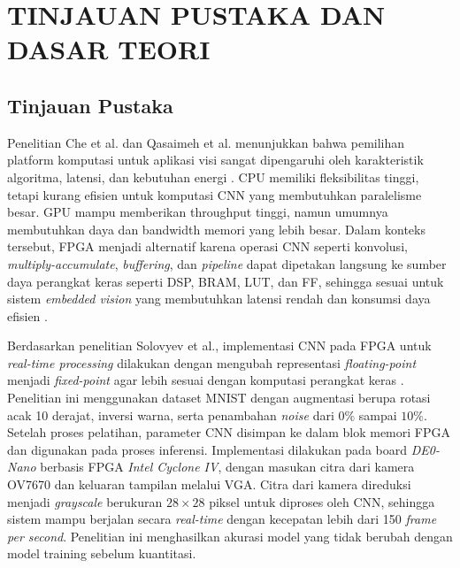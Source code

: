 \chapter{TINJAUAN PUSTAKA DAN DASAR TEORI}

\section{Tinjauan Pustaka}

    Penelitian Che et al. dan Qasaimeh et al. menunjukkan bahwa pemilihan
    platform komputasi untuk aplikasi visi sangat dipengaruhi oleh
    karakteristik algoritma, latensi, dan kebutuhan energi
    \cite{Che2009AcceleratingAA,Qasaimeh2019ComparingEE}. CPU memiliki
    fleksibilitas tinggi, tetapi kurang efisien untuk komputasi CNN yang
    membutuhkan paralelisme besar. GPU mampu memberikan throughput tinggi,
    namun umumnya membutuhkan daya dan bandwidth memori yang lebih besar.
    Dalam konteks tersebut, FPGA menjadi alternatif karena operasi CNN
    seperti konvolusi, \emph{multiply-accumulate}, \emph{buffering}, dan
    \emph{pipeline} dapat dipetakan langsung ke sumber daya perangkat keras
    seperti DSP, BRAM, LUT, dan FF, sehingga sesuai untuk sistem
    \emph{embedded vision} yang membutuhkan latensi rendah dan konsumsi
    daya efisien \cite{XilinxWP389}.

    Berdasarkan penelitian Solovyev et al., implementasi CNN pada FPGA
    untuk \emph{real-time processing} dilakukan dengan mengubah
    representasi \emph{floating-point} menjadi \emph{fixed-point} agar
    lebih sesuai dengan komputasi perangkat keras
    \cite{Solovyev2019FixedPointCNN}. Penelitian ini menggunakan dataset
    MNIST dengan augmentasi berupa rotasi acak 10 derajat, inversi warna,
    serta penambahan \emph{noise} dari $0\%$ sampai $10\%$. Setelah proses
    pelatihan, parameter CNN disimpan ke dalam blok memori FPGA dan
    digunakan pada proses inferensi. Implementasi dilakukan pada board
    \emph{DE0-Nano} berbasis FPGA \emph{Intel Cyclone IV}, dengan masukan
    citra dari kamera OV7670 dan keluaran tampilan melalui VGA. Citra dari
    kamera direduksi menjadi \emph{grayscale} berukuran $28 \times 28$
    piksel untuk diproses oleh CNN, sehingga sistem mampu berjalan secara
    \emph{real-time} dengan kecepatan lebih dari 150 \emph{frame per second}.
    Penelitian ini menghasilkan akurasi model yang tidak berubah dengan
    model training sebelum kuantitasi.

